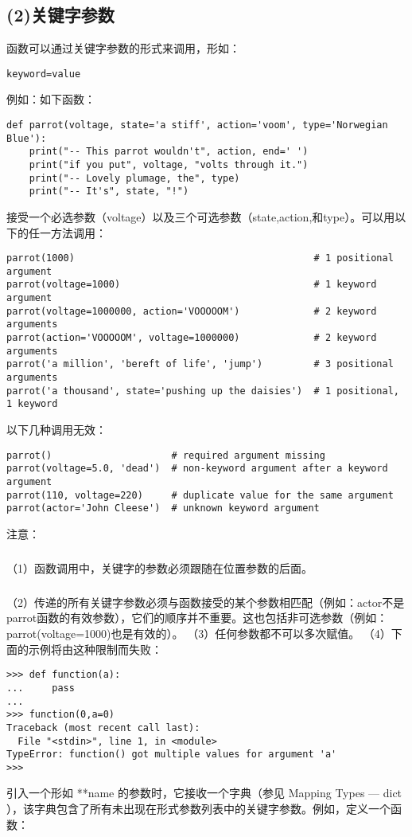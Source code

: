 \documentclass{article}
\begin{document}
\begin{CJK}{UTF8}{gbsn}
\subsection*{(2)关键字参数}
函数可以通过关键字参数的形式来调用，形如：
\begin{verbatim}
keyword=value
\end{verbatim}
例如：如下函数：
\begin{verbatim}
def parrot(voltage, state='a stiff', action='voom', type='Norwegian Blue'):
    print("-- This parrot wouldn't", action, end=' ')
    print("if you put", voltage, "volts through it.")
    print("-- Lovely plumage, the", type)
    print("-- It's", state, "!")
\end{verbatim}
接受一个必选参数（voltage）以及三个可选参数（state,action,和type）。可以用以下的任一方法调用：
\begin{verbatim}
parrot(1000)                                          # 1 positional argument
parrot(voltage=1000)                                  # 1 keyword argument
parrot(voltage=1000000, action='VOOOOOM')             # 2 keyword arguments
parrot(action='VOOOOOM', voltage=1000000)             # 2 keyword arguments
parrot('a million', 'bereft of life', 'jump')         # 3 positional arguments
parrot('a thousand', state='pushing up the daisies')  # 1 positional, 1 keyword
\end{verbatim}
以下几种调用无效：
\begin{verbatim}
parrot()                     # required argument missing
parrot(voltage=5.0, 'dead')  # non-keyword argument after a keyword argument
parrot(110, voltage=220)     # duplicate value for the same argument
parrot(actor='John Cleese')  # unknown keyword argument
\end{verbatim}
注意：
\subparagraph*{}
（1）函数调用中，关键字的参数必须跟随在位置参数的后面。
\subparagraph*{}
（2）传递的所有关键字参数必须与函数接受的某个参数相匹配（例如：actor不是parrot函数的有效参数），它们的顺序并不重要。这也包括非可选参数（例如：parrot(voltage=1000)也是有效的）。
（3）任何参数都不可以多次赋值。
（4）下面的示例将由这种限制而失败：
\begin{verbatim}
>>> def function(a):
...     pass
... 
>>> function(0,a=0)
Traceback (most recent call last):
  File "<stdin>", line 1, in <module>
TypeError: function() got multiple values for argument 'a'
>>> 
\end{verbatim}
引入一个形如 **name 的参数时，它接收一个字典（参见 Mapping Types — dict ），该字典包含了所有未出现在形式参数列表中的关键字参数。例如，定义一个函数：

\end{CJK}
\end{document}
